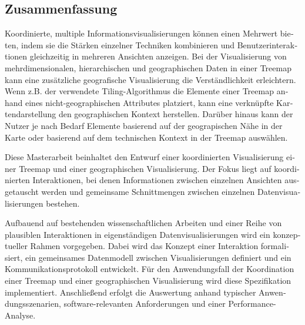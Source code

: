 \begin{otherlanguage}{german}
\chapter*{Zusammenfassung}

Koordinierte, multiple Informationsvisualisierungen können einen Mehrwert bieten, indem sie die Stärken einzelner Techniken kombinieren und Benutzerinteraktionen gleichzeitig in mehreren Ansichten anzeigen.
Bei der Visualisierung von mehrdimensionalen, hierarchischen und geographischen Daten in einer Treemap kann eine zusätzliche geografische Visualisierung die Verständlichkeit erleichtern.
Wenn z.B. der verwendete Tiling-Algorithmus die Elemente einer Treemap anhand eines nicht-geographischen Attributes platziert, kann eine verknüpfte Kartendarstellung den geographischen Kontext herstellen.
Darüber hinaus kann der Nutzer je nach Bedarf Elemente basierend auf der geograpischen Nähe in der Karte oder basierend auf dem technischen Kontext in der Treemap auswählen.

Diese Masterarbeit beinhaltet den Entwurf einer koordinierten Visualisierung einer Treemap und einer geographischen Visualisierung.
Der Fokus liegt auf koordinierten Interaktionen, bei denen Informationen zwischen einzelnen Ansichten ausgetauscht werden und gemeinsame Schnittmengen zwischen einzelnen Datenvisualisierungen bestehen.

Aufbauend auf bestehenden wissenschaftlichen Arbeiten und einer Reihe von plausiblen Interaktionen in eigenständigen Datenvisualisierungen wird ein konzeptueller Rahmen vorgegeben.
Dabei wird das Konzept einer Interaktion formalisiert, ein gemeinsames Datenmodell zwischen Visualisierungen definiert und ein Kommunikationsprotokoll entwickelt.
Für den Anwendungsfall der Koordination einer Treemap und einer geographischen Visualisierung wird diese Spezifikation implementiert.
Anschließend erfolgt die Auswertung anhand typischer Anwendungsszenarien, software-relevanten Anforderungen und einer Performance-Analyse.

\end{otherlanguage}

